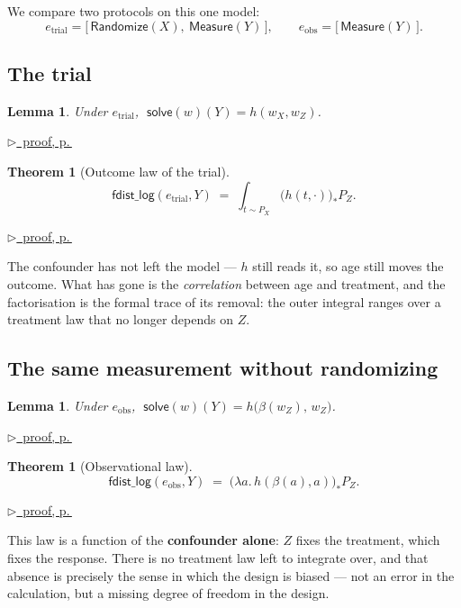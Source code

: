 \documentclass[11pt,a4paper]{article}
\theoremstyle{definition}
\theoremstyle{plain}
\newtheorem{theorem}[definition]{Theorem}
\newtheorem{lemma}[definition]{Lemma}
\theoremstyle{remark}
\newcommand{\solve}{\mathsf{solve}}
\newcommand{\push}[1]{{#1}_{*}}        %
\newcommand{\pfref}[1]{%
  \par\smallskip\noindent
  \hyperref[pf:#1]{\small$\triangleright$\ proof, p.\,\pageref{pf:#1}}\par\smallskip}
\begin{document}
We compare two protocols on this one model:
\[
  e_{\mathrm{trial}} = \bigl[\,\mathsf{Randomize}(X),\ \mathsf{Measure}(Y)\,\bigr],
  \qquad
  e_{\mathrm{obs}} = \bigl[\,\mathsf{Measure}(Y)\,\bigr].
\]

\subsection{The trial}

\begin{lemma}
\label{lem:rct3}
Under $e_{\mathrm{trial}}$, $\;\solve(w)(Y) = h(w_X, w_Z)$.
\end{lemma}

\pfref{lem:rct3}

\begin{theorem}[Outcome law of the trial]
\label{thm:rct3}
\[
  \mathsf{fdist\_log}(e_{\mathrm{trial}}, Y)
  \;=\;
  \int_{t \sim P_X} \push{\bigl(h(t,\cdot)\bigr)} P_Z .
\]
\end{theorem}

\pfref{thm:rct3}

The confounder has not left the model --- $h$ still reads it, so age still
moves the outcome. What has gone is the \emph{correlation} between age and
treatment, and the factorisation is the formal trace of its removal: the
outer integral ranges over a treatment law that no longer depends on $Z$.

\subsection{The same measurement without randomizing}

\begin{lemma}
\label{lem:obs3}
Under $e_{\mathrm{obs}}$, $\;\solve(w)(Y) = h\bigl(\beta(w_Z),\, w_Z\bigr)$.
\end{lemma}

\pfref{lem:obs3}

\begin{theorem}[Observational law]
\label{thm:obs3}
\[
  \mathsf{fdist\_log}(e_{\mathrm{obs}}, Y)
  \;=\;
  \push{\bigl(\lambda a.\, h(\beta(a), a)\bigr)} P_Z .
\]
\end{theorem}

\pfref{thm:obs3}

This law is a function of the \textbf{confounder alone}: $Z$ fixes the
treatment, which fixes the response. There is no treatment law left to
integrate over, and that absence is precisely the sense in which the design
is biased --- not an error in the calculation, but a missing degree of
freedom in the design.
\end{document}
